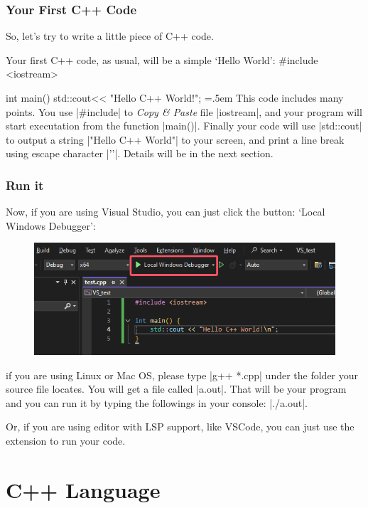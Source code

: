 \documentclass[compress,xcolor={dvipsnames}]{beamer}
\newenvironment{lcverbatim}
 {\SaveVerbatim{cverb}}
 {\endSaveVerbatim
  \flushleft\fboxrule=0pt\fboxsep=.5em
  \colorbox{cverbbg}{%
    \makebox[\dimexpr\linewidth-2\fboxsep][l]{\BUseVerbatim{cverb}}%
  }
  \endflushleft
}
\begin{document}
\begin{frame}[fragile]
    \frametitle{Your First C++ Code}

    So, let's try to write a little piece of C++ code.

    Your first C++ code, as usual, will be a simple `Hello World':
    \begin{lcverbatim}
        #include <iostream>

        int main(){
                std::cout<< "Hello C++ World!\n";
            }
    \end{lcverbatim}
    This code includes many points. You use \cverb|#include| to \emph{Copy \& Paste} file \cverb|iostream|, and your program will start executation from the function \cverb|main()|. Finally your code will use \cverb|std::cout| to output a string \cverb|"Hello C++ World"| to your screen, and print a line break using escape character \cverb|'\n'|. Details will be in the next section.

\end{frame}

\begin{frame}[fragile]
    \frametitle{Run it}

    Now, if you are using Visual Studio, you can just click the button: `Local Windows Debugger':
    \begin{figure}[!h]
        \centering
        \includegraphics[width=0.50\linewidth]{pic/VS_Build.png}
    \end{figure}
    if you are using Linux or Mac OS, please type \cverb|g++ *.cpp| under the folder your source file locates. You will get a file called \cverb|a.out|. That will be your program and you can run it by typing the followings in your console: \cverb|./a.out|.

    Or, if you are using editor with LSP support, like VSCode, you can just use the extension to run your code.
\end{frame}

\section{C++ Language}
\end{document}
